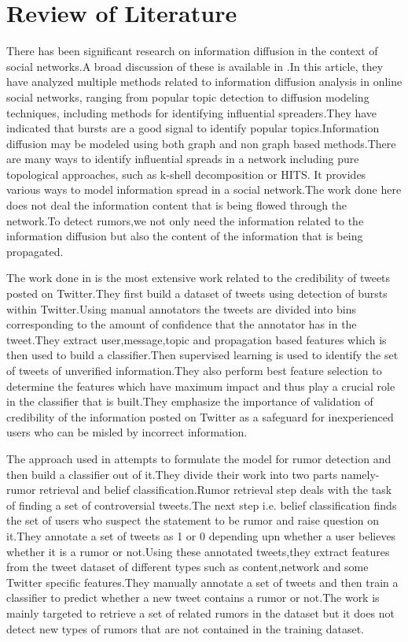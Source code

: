 \chapter{Review of Literature} 
There has been significant research on information diffusion in the context of social networks.A broad discussion of these is available in \cite{guille2013information}.In this article, they have analyzed multiple methods related to information diffusion analysis in online social networks, ranging
from popular topic detection to diffusion modeling techniques, including methods for identifying influential spreaders.They have indicated that bursts are a good signal to identify popular topics.Information diffusion may be modeled using both graph and non graph based methods.There are many ways to identify influential spreads in a network including pure topological approaches, such as k-shell decomposition or HITS.
It provides various ways to model information spread in a social network.The work done here does not deal the information content that is being flowed through the network.To detect rumors,we not only need the information related to the information diffusion but also the content of the information that is being propagated. \\
\par 
The work done in \cite{castillo2011information} is the most extensive work related to the credibility of tweets posted on Twitter.They first build a dataset of tweets using detection of bursts within Twitter.Using manual annotators the tweets are divided into bins corresponding  to the amount of confidence that the annotator has in the tweet.They extract user,message,topic and propagation based features which is then used to build a classifier.Then supervised learning is used to identify the set of tweets of unverified information.They also perform best feature selection to determine the features which have maximum impact and thus play a crucial role in the classifier that is built.They emphasize the importance of validation of credibility of the information posted on Twitter as a safeguard for inexperienced users who can be misled by incorrect information. 
\\
\par
The approach used in \cite{qazvinian2011rumor} attempts to formulate the model for rumor detection and then build a classifier out of it.They divide their work into two parts namely-rumor retrieval and belief classification.Rumor retrieval step deals with the task of finding a set of controversial tweets.The next step i.e. belief classification finds the set of users who suspect the statement to be rumor and raise question on it.They annotate a set of tweets as 1 or 0 depending upn whether a user believes whether it is a rumor or not.Using these annotated tweets,they extract features from the tweet dataset of different types such as content,network and some Twitter specific features.They manually annotate a set of tweets and then train a classifier to predict whether a new tweet contains a rumor or not.The work is mainly targeted to retrieve a set of related rumors in the dataset but it does not detect new types of rumors that are not contained in the training dataset.\\ 

